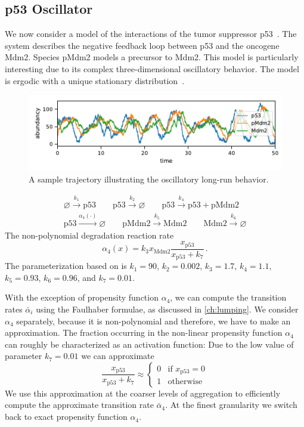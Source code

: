 \subsection{p53 Oscillator}
We now consider a model of the interactions of the tumor suppressor p53~\cite{geva2006oscillations}. The system describes the negative feedback loop between  p53 and the oncogene Mdm2.
Species pMdm2 models a precursor to Mdm2. This model is particularly interesting due to its complex three-dimensional oscillatory behavior.
The model is ergodic with a unique stationary distribution~\cite{gupta2014scalable}.
\begin{figure}[htb]
    \centering
    \includegraphics[width=\textwidth]{gfx/p53_traj.pdf}
    \caption{A sample trajectory illustrating the oscillatory long-run behavior. }
    \label{fig:p53:traj}
\end{figure}
\begin{model}[p53 Oscillator]\label{model:p53}
\begin{align*}
\varnothing \xrightarrow{k_1} \mathrm{p53} \qquad
\mathrm{p53} \xrightarrow{k_2} \varnothing \qquad
\mathrm{p53} \xrightarrow{k_4} \mathrm{p53} + \mathrm{pMdm2}
\\
\mathrm{p53} \xrightarrow{\alpha_4(\cdot)} \varnothing \qquad
\mathrm{pMdm2} \xrightarrow{k_5} \mathrm{Mdm2} \qquad
\mathrm{Mdm2} \xrightarrow{k_6} \varnothing
\end{align*}
The non-polynomial degradation reaction rate
	\[
\alpha_4(x) =k_3 x_{\mathrm{Mdm2}} \frac{x_{\mathrm{p53}}}{x_{\mathrm{p53}} + k_7}\,.
\]
The parameterization based on \cite{ale2013general} is $k_1=90$, $k_2=0.002$, $k_3=1.7$, $k_4=1.1$, $k_5=0.93$, $k_6=0.96$, and $k_7 = 0.01$.
\end{model}
With the exception of propensity function $\alpha_4$, we can compute the transition rates $\bar{\alpha}_i$ using the Faulhaber formulae, as discussed in \autoref{ch:lumping}.
We consider $\alpha_4$ separately, because it is non-polynomial and therefore, we have to make an approximation.
The fraction occurring in the non-linear propensity function $\alpha_4$ can roughly be characterized as an activation function:
Due to the low value of parameter $k_7=0.01$ we can approximate
\[\frac{x_{\mathrm{p53}}}{x_{\mathrm{p53}} + k_7}
\approx
\begin{cases}
0 & \text{if } x_{\mathrm{p53}} = 0\\
1 & \text{otherwise}
\end{cases}
\]
We use this approximation at the coarser levels of aggregation to efficiently compute the approximate transition rate $\bar{\alpha}_4$.
At the finest granularity we switch back to exact propensity function $\alpha_4$.

